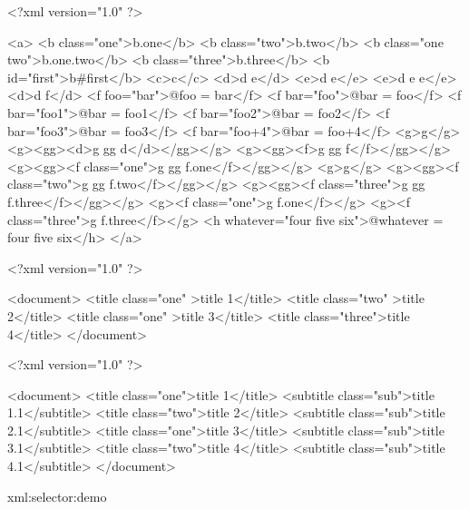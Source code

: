 
\definecolor[maincolor][b=.4]

\setuppapersize[A4][A4]

\startdocument[title=CSS selectors,subtitle={\CONTEXT\ 2017 Maibach}]

\startbuffer[selector-001]
<?xml version="1.0" ?>

<a>
    <b class="one">b.one</b>
    <b class="two">b.two</b>
    <b class="one two">b.one.two</b>
    <b class="three">b.three</b>
    <b id="first">b#first</b>
    <c>c</c>
    <d>d e</d>
    <e>d e</e>
    <e>d e e</e>
    <d>d f</d>
    <f foo="bar">@foo = bar</f>
    <f bar="foo">@bar = foo</f>
    <f bar="foo1">@bar = foo1</f>
    <f bar="foo2">@bar = foo2</f>
    <f bar="foo3">@bar = foo3</f>
    <f bar="foo+4">@bar = foo+4</f>
    <g>g</g>
    <g><gg><d>g gg d</d></gg></g>
    <g><gg><f>g gg f</f></gg></g>
    <g><gg><f class="one">g gg f.one</f></gg></g>
    <g>g</g>
    <g><gg><f class="two">g gg f.two</f></gg></g>
    <g><gg><f class="three">g gg f.three</f></gg></g>
    <g><f class="one">g f.one</f></g>
    <g><f class="three">g f.three</f></g>
    <h whatever="four five six">@whatever = four five six</h>
</a>
\stopbuffer

\startbuffer[selector-002]
<?xml version="1.0" ?>

<document>
    <title class="one"  >title 1</title>
    <title class="two"  >title 2</title>
    <title class="one"  >title 3</title>
    <title class="three">title 4</title>
</document>
\stopbuffer

\startbuffer[selector-003]
<?xml version="1.0" ?>

<document>
    <title    class="one">title 1</title>
    <subtitle class="sub">title 1.1</subtitle>
    <title    class="two">title 2</title>
    <subtitle class="sub">title 2.1</subtitle>
    <title    class="one">title 3</title>
    <subtitle class="sub">title 3.1</subtitle>
    <title    class="two">title 4</title>
    <subtitle class="sub">title 4.1</subtitle>
</document>
\stopbuffer


\startxmlsetups xml:selector:demo
    \ignorespaces{}\par
\stopxmlsetups

\unexpanded{}

